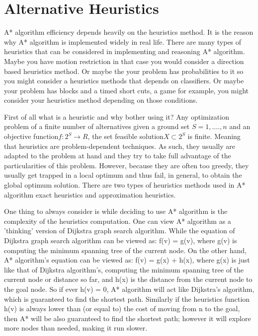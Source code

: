 \documentclass[12pt]{article}
\begin{document}
\section{Alternative Heuristics}
\label{sec:alternativeHeuristics}
A* algorithm efficiency depends heavily on the heuristics method. It is the reason why A* algorithm is implemented widely in real life. There are many types of heuristics that can be considered in implementing and reasoning A* algorithm. Maybe you have motion restriction in that case you would consider a direction based heuristics method. Or maybe the your problem has probabilities to it so you might consider a heuristics methods that depends on classifiers. Or maybe your problem has blocks and a timed short cuts, a game for example, you might consider your heuristics method depending on those conditions.

First of all what is a heuristic and why bother using it? Any optimization problem of a finite number of alternatives given a ground set \begin{math} S = {1,....,n} \end{math} and an objective function\begin{math} f : 2^S \rightarrow R\end{math}, the set feasible solution\begin{math} X \subset 2^S\end{math} is finite. Meaning that heuristics are problem-dependent techniques. As such, they usually are adapted to the problem at hand and they try to take full advantage of the particularities of this problem. However, because they are often too greedy, they usually get trapped in a local optimum and thus fail, in general, to obtain the global optimum solution. There are two types of heuristics methods used in A* algorithm exact heuristics and approximation heuristics.

One thing to always consider is while deciding to use A* algorithm is the complexity of the heuristics computation. One can view A* algorithm as a 'thinking' version of Dijkstra graph search algorithm. While the equation of Dijkstra graph search algorithm can be viewed as:  f(v) = g(v), where g(v) is computing the minimum spanning tree of the current node. On the other hand, A* algorithm's equation can be viewed as: f(v) = g(x) + h(x), where g(x) is just like that of Dijkstra algorithm's, computing the minimum spanning tree of the current node or distance so far, and h(x) is the distance from the current node to the goal node. So if ever h(v) = 0, A* algorithm will act like Dijkstra's algorithm, which is guaranteed to find the shortest path. Similarly if the heuristics function h(v) is always lower than (or equal to) the cost of moving from n to the goal, then A* will be also guaranteed to find the shortest path; however it will explore more nodes than needed, making it run slower.
\end{document}
